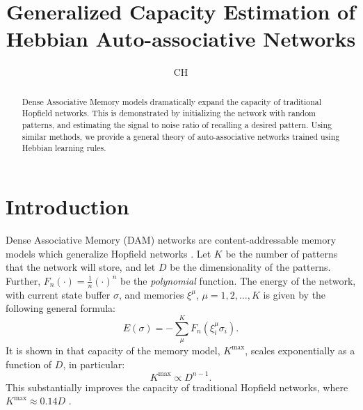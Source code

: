 \documentclass[nobib]{tufte-handout}
\title{Generalized Capacity Estimation of Hebbian Auto-associative Networks}
\author{CH}
\theoremstyle{definition}
\begin{document}
\maketitle

\begin{abstract}
    Dense Associative Memory models dramatically expand the capacity of
    traditional Hopfield networks. This is demonstrated by initializing
    the network with random patterns, and estimating the signal to noise
    ratio of recalling a desired pattern. Using similar methods, we 
    provide a general theory of auto-associative networks trained 
    using Hebbian learning rules.
\end{abstract}

\section{Introduction}

Dense Associative Memory (DAM) networks are content-addressable memory models
which generalize Hopfield networks \parencites{hopfield_neural_1982,krotov_dense_2016}.
Let $K$ be the number of patterns that the network will store, and let $D$
be the dimensionality of the patterns. Further, $F_n (\cdot) = \frac{1}{n} (\cdot)^n$
be the \textit{polynomial} function. The energy of the network, with current
state buffer $\sigma$, and memories $\xi^\mu$, $\mu = 1, 2, \dots, K$ is given
by the following general formula:
\begin{equation}
    E(\sigma) = - \sum^K_{\mu} F_n (\xi^\mu_i \sigma_i).
\end{equation}
It is shown in \textcites{demircigil_model_2017,krotov_dense_2016} that 
capacity of the memory model, $K^\text{max}$, scales exponentially as a function
of $D$, in particular:
\begin{equation}
K^\text{max} \propto D^{n-1}.
\end{equation}
This substantially improves the capacity of traditional Hopfield networks,
where $K^\text{max} \approx 0.14 D$ \parencite{hopfield_neural_1982}.
\end{document}

